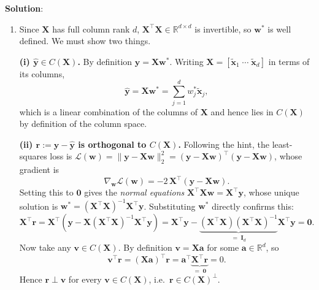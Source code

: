 \documentclass[submit]{../harvardml}
\newenvironment{solution}{
    \vspace{2mm}
    \color{blue}\noindent\textbf{Solution}:
}{}
\begin{document}
\begin{solution}


\begin{enumerate}

\item
Since $\mathbf X$ has full column rank $d$, $\mathbf X^\top \mathbf X \in
\mathbb{R}^{d \times d}$ is invertible, so $\mathbf w^*$ is well defined.
We must show two things.

\textbf{(i) $\hat{\mathbf y} \in C(\mathbf X)$.}
By definition $\hat{\mathbf y} = \mathbf X \mathbf w^*$. Writing $\mathbf X =
[\tilde{\mathbf x}_1 \;\cdots\; \tilde{\mathbf x}_d]$ in terms of its columns,
\[
  \hat{\mathbf y} = \mathbf X \mathbf w^* = \sum_{j=1}^{d} w^*_j \tilde{\mathbf x}_j ,
\]
which is a linear combination of the columns of $\mathbf X$ and hence lies in
$C(\mathbf X)$ by definition of the column space.

\textbf{(ii) $\mathbf r := \mathbf y - \hat{\mathbf y}$ is orthogonal to
$C(\mathbf X)$.}
Following the hint, the least-squares loss is
$\mathcal L(\mathbf w) = \|\mathbf y - \mathbf X \mathbf w\|_2^2
 = (\mathbf y - \mathbf X\mathbf w)^\top(\mathbf y - \mathbf X \mathbf w)$,
whose gradient is
\[
  \nabla_{\mathbf w}\mathcal L(\mathbf w)
  = -2\,\mathbf X^\top(\mathbf y - \mathbf X \mathbf w).
\]
Setting this to $\mathbf 0$ gives the \emph{normal equations}
$\mathbf X^\top \mathbf X \mathbf w = \mathbf X^\top \mathbf y$, whose unique
solution is $\mathbf w^* = (\mathbf X^\top\mathbf X)^{-1}\mathbf X^\top \mathbf y$.
Substituting $\mathbf w^*$ directly confirms this:
\[
  \mathbf X^\top \mathbf r
  = \mathbf X^\top\!\left(\mathbf y - \mathbf X (\mathbf X^\top \mathbf X)^{-1}\mathbf X^\top \mathbf y\right)
  = \mathbf X^\top \mathbf y - \underbrace{(\mathbf X^\top \mathbf X)(\mathbf X^\top \mathbf X)^{-1}}_{=\;\mathbf I_d}\mathbf X^\top \mathbf y
  = \mathbf 0 .
\]
Now take any $\mathbf v \in C(\mathbf X)$. By definition $\mathbf v = \mathbf X
\mathbf a$ for some $\mathbf a \in \mathbb{R}^d$, so
\[
  \mathbf v^\top \mathbf r = (\mathbf X\mathbf a)^\top \mathbf r
  = \mathbf a^\top \underbrace{\mathbf X^\top \mathbf r}_{=\;\mathbf 0} = 0 .
\]
Hence $\mathbf r \perp \mathbf v$ for every $\mathbf v \in C(\mathbf X)$, i.e.\
$\mathbf r \in C(\mathbf X)^\perp$.


\end{enumerate}
\end{solution}
\end{document}
